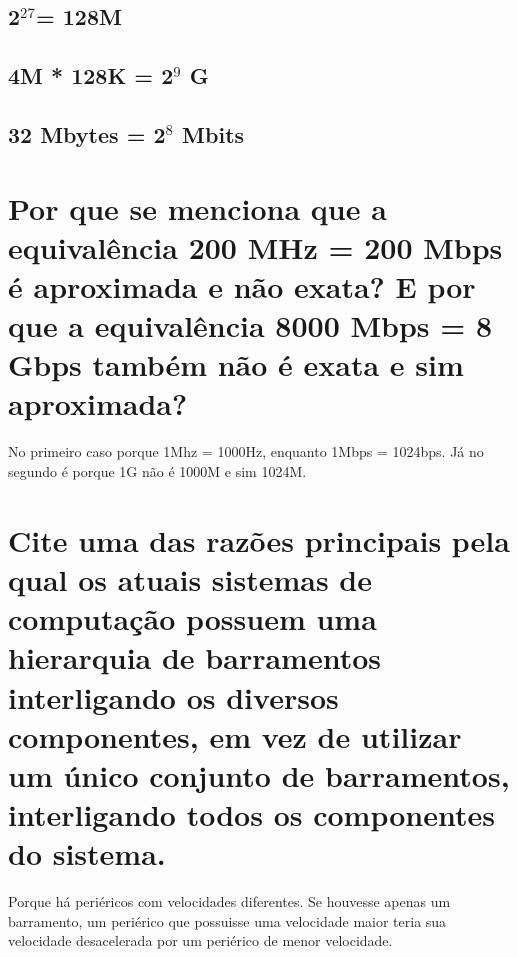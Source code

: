 \documentclass[
	12pt,				%
	openright,			%
	twoside,			%
	a4paper,			%
	english,			%
	french,				%
	spanish,			%
	brazil,				%
	]{abntex2}
\begin{document}
\subsection{2\(^{\text{27}}\)= 128M}
\label{sec:org1fdbf42}
\subsection{4M * 128K = 2\(^{\text{9}}\) G}
\label{sec:org067240b}
\subsection{32 Mbytes = 2\(^{\text{8}}\) Mbits}
\label{sec:org5c041de}
\section{Por que se menciona que a equivalência 200 MHz = 200 Mbps é aproximada e não exata? E por que a equivalência 8000 Mbps = 8 Gbps também não é exata e sim aproximada?}
\label{sec:org2d179f9}
No primeiro caso porque 1Mhz = 1000Hz, enquanto 1Mbps = 1024bps. Já no segundo é
porque 1G não é 1000M e sim 1024M.
\section{Cite uma das razões principais pela qual os atuais sistemas de computação possuem uma hierarquia de barramentos interligando os diversos componentes, em vez de utilizar um único conjunto de barramentos, interligando todos os componentes do sistema.}
\label{sec:orge1ca712}
Porque há periéricos com velocidades diferentes. Se houvesse apenas um
barramento, um periérico que possuisse uma velocidade maior teria sua velocidade
desacelerada por um periérico de menor velocidade.
\end{document}
